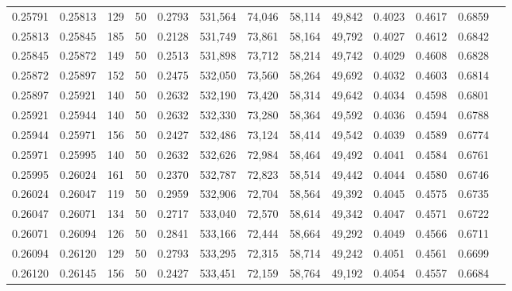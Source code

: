 \begin{tabular}{rrrrrrrrrrrrr}
0.25791 & 0.25813 &   129 &  50 &                                     0.2793 & 531,564 &  74,046 &  58,114 &  49,842 & 0.4023 & 0.4617 & 0.6859 \\
0.25813 & 0.25845 &   185 &  50 &                                     0.2128 & 531,749 &  73,861 &  58,164 &  49,792 & 0.4027 & 0.4612 & 0.6842 \\
0.25845 & 0.25872 &   149 &  50 &                                     0.2513 & 531,898 &  73,712 &  58,214 &  49,742 & 0.4029 & 0.4608 & 0.6828 \\
0.25872 & 0.25897 &   152 &  50 &                                     0.2475 & 532,050 &  73,560 &  58,264 &  49,692 & 0.4032 & 0.4603 & 0.6814 \\
0.25897 & 0.25921 &   140 &  50 &                                     0.2632 & 532,190 &  73,420 &  58,314 &  49,642 & 0.4034 & 0.4598 & 0.6801 \\
0.25921 & 0.25944 &   140 &  50 &                                     0.2632 & 532,330 &  73,280 &  58,364 &  49,592 & 0.4036 & 0.4594 & 0.6788 \\
0.25944 & 0.25971 &   156 &  50 &                                     0.2427 & 532,486 &  73,124 &  58,414 &  49,542 & 0.4039 & 0.4589 & 0.6774 \\
0.25971 & 0.25995 &   140 &  50 &                                     0.2632 & 532,626 &  72,984 &  58,464 &  49,492 & 0.4041 & 0.4584 & 0.6761 \\
0.25995 & 0.26024 &   161 &  50 &                                     0.2370 & 532,787 &  72,823 &  58,514 &  49,442 & 0.4044 & 0.4580 & 0.6746 \\
0.26024 & 0.26047 &   119 &  50 &                                     0.2959 & 532,906 &  72,704 &  58,564 &  49,392 & 0.4045 & 0.4575 & 0.6735 \\
0.26047 & 0.26071 &   134 &  50 &                                     0.2717 & 533,040 &  72,570 &  58,614 &  49,342 & 0.4047 & 0.4571 & 0.6722 \\
0.26071 & 0.26094 &   126 &  50 &                                     0.2841 & 533,166 &  72,444 &  58,664 &  49,292 & 0.4049 & 0.4566 & 0.6711 \\
0.26094 & 0.26120 &   129 &  50 &                                     0.2793 & 533,295 &  72,315 &  58,714 &  49,242 & 0.4051 & 0.4561 & 0.6699 \\
0.26120 & 0.26145 &   156 &  50 &                                     0.2427 & 533,451 &  72,159 &  58,764 &  49,192 & 0.4054 & 0.4557 & 0.6684 \\

\end{tabular}
